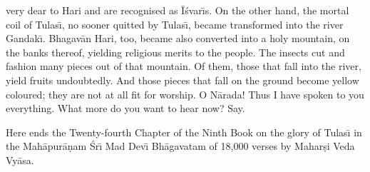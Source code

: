 very dear to Hari and are recognised as \=I\'svar\={\i}s. On the other hand, the mortal coil of Tulas\={\i}, no sooner quitted by Tulas\={\i}, became transformed into the river Gandak\={\i}. Bhagav\=an Hari, too, became also converted into a holy mountain, on the banks thereof, yielding religious merits to the people. The insects cut and fashion many pieces out of that mountain. Of them, those that fall into the river, yield fruits undoubtedly. And those pieces that fall on the ground become yellow coloured; they are not at all fit for worship. O N\=arada! Thus I have spoken to you everything. What more do you want to hear now? Say.

Here ends the Twenty-fourth Chapter of the Ninth Book on the glory of Tulas\={\i} in the Mah\=apur\=a\d{n}am \'Sr\={\i} Mad Dev\={\i} Bh\=agavatam of 18,000 verses by Mahar\d{s}i Veda Vy\=asa.




